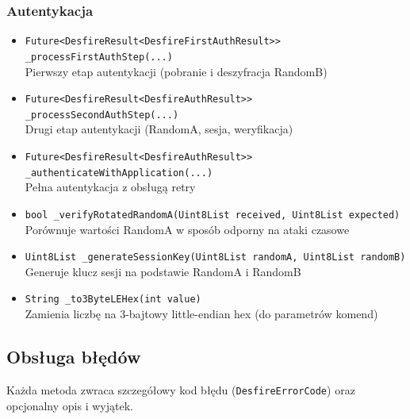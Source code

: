 \documentclass[a4paper,12pt]{article}
\begin{document}
\subsubsection*{Autentykacja}
\begin{itemize}
    \item \texttt{Future<DesfireResult<DesfireFirstAuthResult>> \_processFirstAuthStep(...)}\\
    Pierwszy etap autentykacji (pobranie i deszyfracja RandomB)
    
    \item \texttt{Future<DesfireResult<DesfireAuthResult>> \_processSecondAuthStep(...)}\\
    Drugi etap autentykacji (RandomA, sesja, weryfikacja)
    
    \item \texttt{Future<DesfireResult<DesfireAuthResult>> \_authenticateWithApplication(...)}\\
    Pełna autentykacja z obsługą retry
    
    \item \texttt{bool \_verifyRotatedRandomA(Uint8List received, Uint8List expected)}\\
    Porównuje wartości RandomA w sposób odporny na ataki czasowe
    
    \item \texttt{Uint8List \_generateSessionKey(Uint8List randomA, Uint8List randomB)}\\
    Generuje klucz sesji na podstawie RandomA i RandomB
    
    \item \texttt{String \_to3ByteLEHex(int value)}\\
    Zamienia liczbę na 3-bajtowy little-endian hex (do parametrów komend)
\end{itemize}

\newpage

\subsection{Obsługa błędów}
Każda metoda zwraca szczegółowy kod błędu (\texttt{DesfireErrorCode}) oraz opcjonalny opis i wyjątek.
\end{document}
